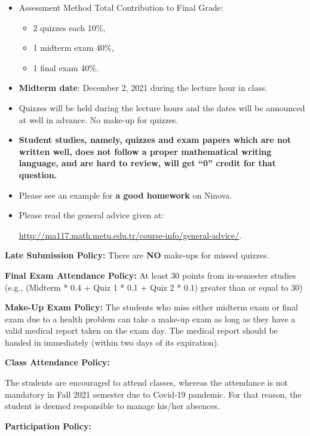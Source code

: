 \documentclass[
  12pt,
]{article}
\providecommand{\tightlist}{%
  \setlength{\itemsep}{0pt}\setlength{\parskip}{0pt}}
\begin{document}
\begin{itemize}
\item
  Assessment Method \quad      \quad \quad                Total
  Contribution to Final Grade:

  \begin{itemize}
  \tightlist
  \item
    2 quizzes each 10\%,\\
  \item
    1 midterm exam 40\%,
  \item
    1 final exam 40\%.
  \end{itemize}
\item
  \textbf{Midterm date}: December 2, 2021 during the lecture hour in
  class.
\item
  Quizzes will be held during the lecture hours and the dates will be
  announced at well in advance. No make-up for quizzes.
\item
  \textbf{Student studies, namely, quizzes and exam papers which are not
  written well, does not follow a proper mathematical writing language,
  and are hard to review, will get ``0'' credit for that question.}
\item
  Please see an example for \textbf{a good homework} on Ninova.
\item
  Please read the general advice given at:

  \url{http://ma117.math.metu.edu.tr/course-info/general-advice/}.
\end{itemize}

\textbf{Late Submission Policy:} There are \textbf{NO} make-ups for
missed quizzes.

\textbf{Final Exam Attendance Policy:} At least 30 points from
in-semester studies (e.g., (Midterm * 0.4 + Quiz 1 * 0.1 + Quiz 2 * 0.1)
greater than or equal to 30)

\textbf{Make-Up Exam Policy:} The students who miss either midterm exam
or final exam due to a health problem can take a make-up exam as long as
they have a valid medical report taken on the exam day. The medical
report should be handed in immediately (within two days of its
expiration).

\textbf{Class Attendance Policy:}

The students are encouraged to attend classes, whereas the attendance is
not mandatory in Fall 2021 semester due to Covid-19 pandemic. For that
reason, the student is deemed responsible to manage his/her absences.

\textbf{Participation Policy:}
\end{document}
